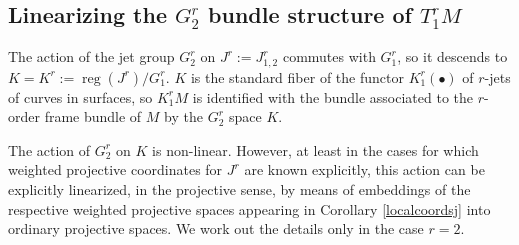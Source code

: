 \documentclass[12pt]{article}
\numberwithin{equation}{section}
\theoremstyle{plain}
\theoremstyle{definition}
\begin{document}
\subsection{Linearizing the $G^{r}_{2}$ bundle structure of $T^{r}_{1}M$}\label{linearizing}

The action of the jet group $G^{r}_{2}$ on $J^{r}:=J^{r}_{1,2}$ commutes with $G^{r}_{1}$, so it descends to $K=K^{r}:=\operatorname{reg}(J^{r})/G^{r}_{1}$. $K$ is the standard fiber of the functor $K^{r}_{1}(\bullet)$ of $r$-jets of curves in surfaces, so $K^{r}_{1}M$ is identified with the bundle associated to the $r$-order frame bundle of $M$ by the $G^{r}_{2}$ space $K$.

The action of $G^{r}_{2}$ on $K$ is non-linear. However, at least in the cases for which weighted projective coordinates for $J^{r}$ are known explicitly, this action can be explicitly linearized, in the projective sense, by means of embeddings of the respective weighted projective spaces appearing in Corollary \ref{localcoordsj} into ordinary projective spaces. We work out the details only in the case $r=2$.
\end{document}
